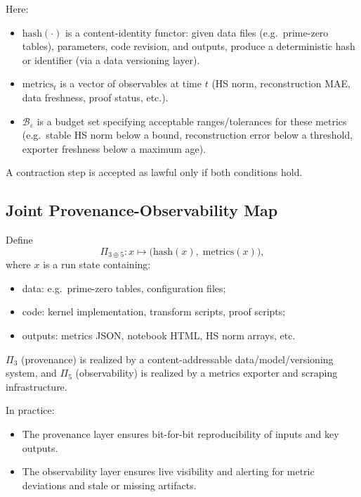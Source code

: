 \documentclass[11pt]{article}
\begin{document}
Here:

\begin{itemize}[leftmargin=*]
  \item $\mathrm{hash}(\cdot)$ is a content-identity functor: given data files (e.g.\ prime-zero tables), parameters, code revision, and outputs, produce a deterministic hash or identifier (via a data versioning layer).
  \item $\mathrm{metrics}_t$ is a vector of observables at time $t$ (HS norm, reconstruction MAE, data freshness, proof status, etc.).
  \item $\mathcal{B}_\varepsilon$ is a budget set specifying acceptable ranges/tolerances for these metrics (e.g.\ stable HS norm below a bound, reconstruction error below a threshold, exporter freshness below a maximum age).
\end{itemize}

A contraction step is accepted as lawful only if both conditions hold.

\subsection{Joint Provenance-Observability Map}

Define
\[
\Pi_{3\oplus 5} : x \mapsto
\bigl(\mathrm{hash}(x),\;\mathrm{metrics}(x)\bigr),
\]
where $x$ is a run state containing:

\begin{itemize}[leftmargin=*]
  \item data: e.g.\ prime-zero tables, configuration files;
  \item code: kernel implementation, transform scripts, proof scripts;
  \item outputs: metrics JSON, notebook HTML, HS norm arrays, etc.
\end{itemize}

$\Pi_{3}$ (provenance) is realized by a content-addressable data/model/versioning system, and $\Pi_{5}$ (observability) is realized by a metrics exporter and scraping infrastructure.

In practice:

\begin{itemize}[leftmargin=*]
  \item The provenance layer ensures bit-for-bit reproducibility of inputs and key outputs.
  \item The observability layer ensures live visibility and alerting for metric deviations and stale or missing artifacts.
\end{itemize}
\end{document}
